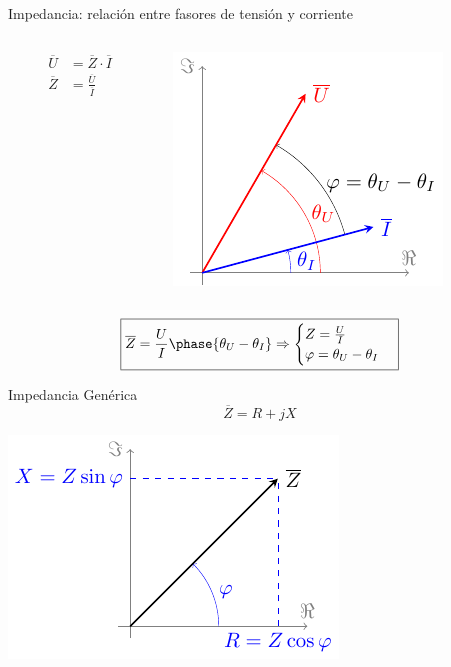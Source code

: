 \documentclass[aspectratio=169, usenames,svgnames,dvipsnames]{beamer}
\begin{document}
\begin{frame}[label={sec:orge6f5f84}]{Impedancia: relación entre fasores de tensión y corriente}
\begin{columns}
\begin{column}{0.5\columnwidth}
\begin{align*}
  \overline{U} &= \overline{Z} \cdot \overline{I}\\                 
  \overline{Z} &= \frac{\overline{U}}{\overline{I}}
\end{align*}
\end{column}

\begin{column}{0.5\columnwidth}
\begin{center}
\includegraphics[height=0.5\textheight]{../figs/fasorTensionCorriente.pdf}
\end{center}
\end{column}
\end{columns}

\[
\boxed{\overline{Z} = \frac{U}{I}\phase{\theta_U - \theta_I} \Rightarrow 
    \begin{cases}
      Z = \frac{U}{I}\\
      \varphi = \theta_U - \theta_I
    \end{cases}}
\]
\end{frame}



\begin{frame}[label={sec:orgb8ca422}]{Impedancia Genérica}
\[
\overline{Z} = R + j X
\]

\begin{center}
\includegraphics[height=0.75\textheight]{../figs/fasorImpedancia.pdf}
\end{center}
\end{frame}
\end{document}
